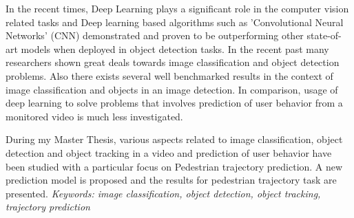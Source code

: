 % 
% 
%
In the recent times, Deep Learning plays a significant role in the computer vision
related tasks and Deep learning based algorithms such as 'Convolutional Neural Networks'
(CNN) demonstrated and proven to be outperforming other state-of-art models when 
deployed in object detection tasks. In the recent past many researchers shown great 
deals towards image classification and object detection problems. Also there exists several 
well benchmarked results in the context of image classification and objects in an image detection.
In comparison, usage of deep learning to solve problems that involves prediction of 
user behavior from a monitored video is much less investigated.

\vspace{1em}
\noindent During my Master Thesis, various aspects related to image classification, object 
detection and object tracking in a video and prediction of user behavior 
have been studied with a particular focus on Pedestrian trajectory prediction. 
A new prediction model is proposed and the results for pedestrian trajectory 
task are presented.
\baselineskip
\textit{Keywords: image classification, object detection, object tracking, trajectory prediction}
